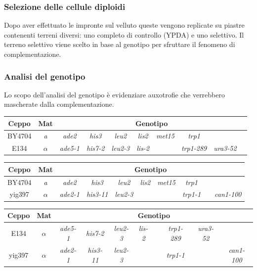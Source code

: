 		\subsubsection*{Selezione delle cellule diploidi}
		Dopo aver effettuato le impronte sul velluto queste vengono replicate su piastre contenenti terreni diversi: uno completo di controllo (YPDA) e uno selettivo. 
		Il terreno selettivo viene scelto in base al genotipo per sfruttare il fenomeno di complementazione.

		\subsubsection{Analisi del genotipo}
		Lo scopo dell'analisi del genotipo \`e evidenziare auxotrofie che verrebbero mascherate dalla complementazione.
		\begin{center}
			\begin{tabular}{|c|c|c|c|c|c|c|c|c|c|}
				\hline
				Ceppo & Mat & \multicolumn{8}{c|}{Genotipo}\\
				\hline
				BY4704 & \emph{a} & \emph{ade2} & \emph{his3} & \emph{leu2} & \emph{lis2} & \emph{met15} & \emph{trp1} & & \\
				\hline
				E134 & $\alpha$ & \emph{ade5-1} & \emph{his7-2} & \emph{leu2-3} & \emph{lis-2} & & \emph{trp1-289} & \emph{ura3-52} & \\
				\hline
			\end{tabular}
		\end{center}
		\begin{center}
			\begin{tabular}{|c|c|c|c|c|c|c|c|c|c|}
				\hline
				Ceppo & Mat & \multicolumn{8}{c|}{Genotipo}\\
				\hline
				BY4704 & \emph{a} & \emph{ade2} & \emph{his3} & \emph{leu2} & \emph{lis2} & \emph{met15} & \emph{trp1} & & \\
				\hline
				yig397 & $\alpha$ & \emph{ade2-1} & \emph{his3-11} & \emph{leu2-3} & & & \emph{trp1-1} & & \emph{can1-100}\\
				\hline
			\end{tabular}
		\end{center}
		\begin{center}
			\begin{tabular}{|c|c|c|c|c|c|c|c|c|c|}
				\hline
				Ceppo & Mat & \multicolumn{8}{c|}{Genotipo}\\
				\hline
				E134 & $\alpha$ & \emph{ade5-1} & \emph{his7-2} & \emph{leu2-3} & \emph{lis-2} & & \emph{trp1-289} & \emph{ura3-52} & \\
				\hline
				yig397 & $\alpha$ & \emph{ade2-1} & \emph{his3-11} & \emph{leu2-3} & & & \emph{trp1-1} & & \emph{can1-100}\\
				\hline
			\end{tabular}
		\end{center}


